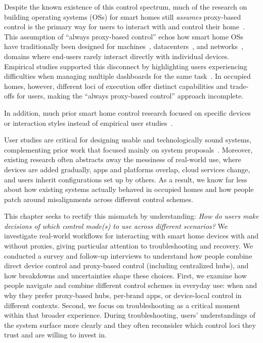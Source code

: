 Despite the known existence of this control spectrum,  much of the research on building operating systems (OSs) for smart homes still {\it assumes} proxy-based control is the primary way for users to interact with and control their home~\cite{HomeOS,Safehome,Transactuations}. This assumption of ``always proxy-based control'' echos how smart home OSs have traditionally been designed for machines~\cite{wulf1974hydra,golub1990mach,ritchie1974unix,unix,linux,freebsd,macos},
datacenters~\cite{tirmazi2020borg, verma2015large, schwarzkopf2013omega}, and networks~\cite{hernandezwireless, lara2013network}, domains where end-users rarely interact directly with individual devices. Empirical studies supported this disconnect by highlighting users experiencing difficulties when managing multiple dashboards for the same task~\cite{kaufhold2024we}.
In occupied homes, however, different loci of execution offer distinct capabilities and trade-offs for users, making the ``always proxy-based control'' approach incomplete. {In addition, much prior smart home control research focused on specific devices or interaction styles instead of empirical user studies~\cite{tap2016ifttt, gabhane2017smart, brackenbury2019users, wozniak2023inhabiting}.

User studies are critical for designing usable and technologically sound systems, complementing prior work that focused mainly on system proposals~\cite{oconnor2019homesnitch, DepSys, Safehome, acar2020peek}.
Moreover, existing research often abstracts away the messiness of real-world use, where devices are added gradually, apps and platforms overlap, cloud services change, and users inherit configurations set up by others. As a result, we know far less about how existing systems actually behaved in occupied homes and how people patch around misalignments across different control schemes.} 

This chapter seeks to rectify this mismatch by understanding: \textit{How do users make decisions of which control mode(s) to use across different scenarios?}
We investigate real-world workflows for interacting with smart home devices with and without proxies, giving particular attention to troubleshooting and recovery. 
We conducted a survey and follow-up interviews to understand how people combine direct device control and proxy-based control (including centralized hubs), and how breakdowns and uncertainties shape these choices. 
First, we examine how people navigate and combine different control schemes in everyday use: when and why they prefer proxy-based hubs, per-brand apps, or device-local control in different contexts. 
Second, we focus on troubleshooting as a critical moment within that broader experience. 
During troubleshooting, users' understandings of the system surface more clearly and they often reconsider which control loci they trust and are willing to invest in.

